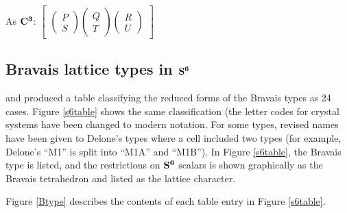 \documentclass[preprint]{iucr}              %
\numberwithin{equation}{section}
\newcommand{\SVI}[0]{$\bf{S^{6}}$}
\newcommand{\CIII}[0]{$\bf{C^{3}}$}
\begin{document}
		As \CIII{}:
		$\begin{bmatrix}
			\begin{pmatrix}
				P   \\
				S
			\end{pmatrix}
			\begin{pmatrix}
				Q   \\
				T
			\end{pmatrix}
			\begin{pmatrix}
				R   \\
				U
			\end{pmatrix}
		\end{bmatrix}$
		

	
	
	\subsection{Bravais lattice types in \SVI{}}
	
	 and  produced
	a table classifying the reduced forms of the Bravais types as 24 cases.
	Figure \ref{s6table} shows the same classification (the 
	letter codes for crystal systems have been changed to modern notation. For some types, revised names have been given
	 to Delone's types where a cell included two types (for example,
	Delone's ``M1'' is split into ``M1A'' and ``M1B''). In Figure \ref{s6table}, the 
	Bravais type is listed, and the restrictions on \SVI{} scalars is shown
	graphically as the Bravais tetrahedron and listed as the lattice character.
	
	
	Figure \ref{Btype} describes the contents of each table entry
	in Figure \ref{s6table}.
	
\end{document}
